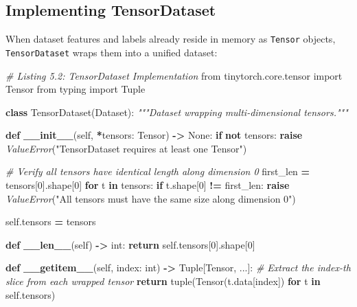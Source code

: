 \documentclass[
  letterpaper,
]{scrbook}
\newenvironment{Shaded}{\begin{snugshade}}{\end{snugshade}}
\newcommand{\BuiltInTok}[1]{#1}
\newcommand{\CommentTok}[1]{\textcolor[rgb]{0.56,0.35,0.01}{\textit{#1}}}
\newcommand{\ControlFlowTok}[1]{\textcolor[rgb]{0.13,0.29,0.53}{\textbf{#1}}}
\newcommand{\DecValTok}[1]{\textcolor[rgb]{0.00,0.00,0.81}{#1}}
\newcommand{\FunctionTok}[1]{\textcolor[rgb]{0.13,0.29,0.53}{\textbf{#1}}}
\newcommand{\ImportTok}[1]{#1}
\newcommand{\KeywordTok}[1]{\textcolor[rgb]{0.13,0.29,0.53}{\textbf{#1}}}
\newcommand{\NormalTok}[1]{#1}
\newcommand{\OperatorTok}[1]{\textcolor[rgb]{0.81,0.36,0.00}{\textbf{#1}}}
\newcommand{\PreprocessorTok}[1]{\textcolor[rgb]{0.56,0.35,0.01}{\textit{#1}}}
\newcommand{\StringTok}[1]{\textcolor[rgb]{0.31,0.60,0.02}{#1}}
\newcommand{\VariableTok}[1]{\textcolor[rgb]{0.00,0.00,0.00}{#1}}
\begin{document}
\subsection{Implementing
TensorDataset}\label{implementing-tensordataset}

When dataset features and labels already reside in memory as
\texttt{Tensor} objects, \texttt{TensorDataset} wraps them into a
unified dataset:

\begin{Shaded}
\begin{Highlighting}[]
\CommentTok{\# Listing 5.2: TensorDataset Implementation}
\ImportTok{from}\NormalTok{ tinytorch.core.tensor }\ImportTok{import}\NormalTok{ Tensor}
\ImportTok{from}\NormalTok{ typing }\ImportTok{import}\NormalTok{ Tuple}

\KeywordTok{class}\NormalTok{ TensorDataset(Dataset):}
    \CommentTok{"""Dataset wrapping multi{-}dimensional tensors."""}

    \KeywordTok{def} \FunctionTok{\_\_init\_\_}\NormalTok{(}\VariableTok{self}\NormalTok{, }\OperatorTok{*}\NormalTok{tensors: Tensor) }\OperatorTok{{-}\textgreater{}} \VariableTok{None}\NormalTok{:}
        \ControlFlowTok{if} \KeywordTok{not}\NormalTok{ tensors:}
            \ControlFlowTok{raise} \PreprocessorTok{ValueError}\NormalTok{(}\StringTok{"TensorDataset requires at least one Tensor"}\NormalTok{)}

        \CommentTok{\# Verify all tensors have identical length along dimension 0}
\NormalTok{        first\_len }\OperatorTok{=}\NormalTok{ tensors[}\DecValTok{0}\NormalTok{].shape[}\DecValTok{0}\NormalTok{]}
        \ControlFlowTok{for}\NormalTok{ t }\KeywordTok{in}\NormalTok{ tensors:}
            \ControlFlowTok{if}\NormalTok{ t.shape[}\DecValTok{0}\NormalTok{] }\OperatorTok{!=}\NormalTok{ first\_len:}
                \ControlFlowTok{raise} \PreprocessorTok{ValueError}\NormalTok{(}\StringTok{"All tensors must have the same size along dimension 0"}\NormalTok{)}

        \VariableTok{self}\NormalTok{.tensors }\OperatorTok{=}\NormalTok{ tensors}

    \KeywordTok{def} \FunctionTok{\_\_len\_\_}\NormalTok{(}\VariableTok{self}\NormalTok{) }\OperatorTok{{-}\textgreater{}} \BuiltInTok{int}\NormalTok{:}
        \ControlFlowTok{return} \VariableTok{self}\NormalTok{.tensors[}\DecValTok{0}\NormalTok{].shape[}\DecValTok{0}\NormalTok{]}

    \KeywordTok{def} \FunctionTok{\_\_getitem\_\_}\NormalTok{(}\VariableTok{self}\NormalTok{, index: }\BuiltInTok{int}\NormalTok{) }\OperatorTok{{-}\textgreater{}}\NormalTok{ Tuple[Tensor, ...]:}
        \CommentTok{\# Extract the index{-}th slice from each wrapped tensor}
        \ControlFlowTok{return} \BuiltInTok{tuple}\NormalTok{(Tensor(t.data[index]) }\ControlFlowTok{for}\NormalTok{ t }\KeywordTok{in} \VariableTok{self}\NormalTok{.tensors)}
\end{Highlighting}
\end{Shaded}
\end{document}

